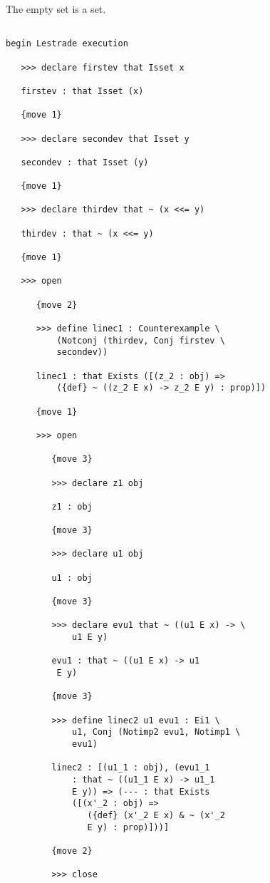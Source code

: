 \documentclass[12pt]{article}
\begin{document}
The empty set is a set.



\begin{verbatim}

begin Lestrade execution

   >>> declare firstev that Isset x

   firstev : that Isset (x)

   {move 1}

   >>> declare secondev that Isset y

   secondev : that Isset (y)

   {move 1}

   >>> declare thirdev that ~ (x <<= y)

   thirdev : that ~ (x <<= y)

   {move 1}

   >>> open

      {move 2}

      >>> define linec1 : Counterexample \
          (Notconj (thirdev, Conj firstev \
          secondev))

      linec1 : that Exists ([(z_2 : obj) => 
          ({def} ~ ((z_2 E x) -> z_2 E y) : prop)])

      {move 1}

      >>> open

         {move 3}

         >>> declare z1 obj

         z1 : obj

         {move 3}

         >>> declare u1 obj

         u1 : obj

         {move 3}

         >>> declare evu1 that ~ ((u1 E x) -> \
             u1 E y)

         evu1 : that ~ ((u1 E x) -> u1 
          E y)

         {move 3}

         >>> define linec2 u1 evu1 : Ei1 \
             u1, Conj (Notimp2 evu1, Notimp1 \
             evu1)

         linec2 : [(u1_1 : obj), (evu1_1 
             : that ~ ((u1_1 E x) -> u1_1 
             E y)) => (--- : that Exists 
             ([(x'_2 : obj) => 
                ({def} (x'_2 E x) & ~ (x'_2 
                E y) : prop)]))]

         {move 2}

         >>> close


\end{verbatim}
\end{document}
